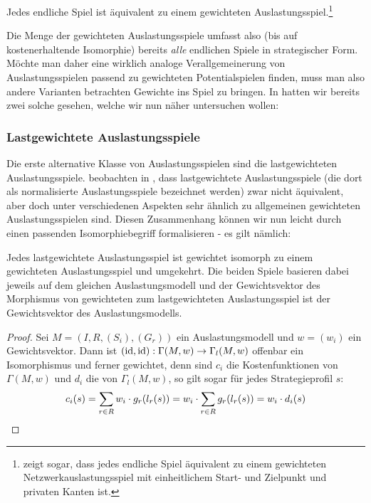 \begin{satz}\label{satz:JedesSpielGewAusl}
	Jedes endliche Spiel ist äquivalent zu einem gewichteten Auslastungsspiel.\footnote{\citeauthor{ReprOfFiniteGamesAsNCG} zeigt sogar, dass jedes endliche Spiel äquivalent zu einem gewichteten Netzwerkauslastungsspiel mit einheitlichem Start- und Zielpunkt und privaten Kanten ist.}
\end{satz}

Die Menge der gewichteten Auslastungsspiele umfasst also (bis auf kostenerhaltende Isomorphie) bereits \emph{alle} endlichen Spiele in strategischer Form. Möchte man daher eine wirklich analoge Verallgemeinerung von Auslastungsspielen passend zu gewichteten Potentialspielen finden, muss man also andere Varianten betrachten Gewichte ins Spiel zu bringen. In  hatten wir bereits zwei solche gesehen, welche wir nun näher untersuchen wollen:

\subsubsection{Lastgewichtete Auslastungsspiele}

Die erste alternative Klasse von Auslastungsspielen sind die lastgewichteten Auslastungsspiele. \citeauthor{CharExGewPotinWCG} beobachten in \cite{CharExGewPotinWCG}, dass lastgewichtete Auslastungsspiele (die dort als normalisierte Auslastungsspiele bezeichnet werden) zwar nicht äquivalent, aber doch unter verschiedenen Aspekten sehr ähnlich zu allgemeinen gewichteten Auslastungsspielen sind. Diesen Zusammenhang können wir nun leicht durch einen passenden Isomorphiebegriff formalisieren - es gilt nämlich:

\begin{lemma}\label{lemma:lastgewAuslIsomGewAusl}
	Jedes lastgewichtete Auslastungsspiel ist gewichtet isomorph zu einem gewichteten Auslastungsspiel und umgekehrt. Die beiden Spiele basieren dabei jeweils auf dem gleichen Auslastungsmodell und der Gewichtsvektor des Morphismus von gewichteten zum lastgewichteten Auslastungsspiel ist der Gewichtsvektor des Auslastungsmodells.
\end{lemma}

\begin{proof}
	Sei $M = (I, R, (S_i), (G_r))$ ein Auslastungsmodell und $w = (w_i)$ ein Gewichtsvektor. Dann ist $(\mathrm{id}, \mathrm{id}): \Gamma(M, w) \to \Gamma_l(M,w)$ offenbar ein Isomorphismus und ferner gewichtet, denn sind $c_i$ die Kostenfunktionen von $\Gamma(M, w)$ und $d_i$ die von $\Gamma_l(M,w)$, so gilt sogar für jedes Strategieprofil $s$:
		\[c_i(s) = \sum_{r \in R} w_i\cdot g_r(l_r(s)) = w_i \cdot \sum_{r \in R} g_r(l_r(s)) = w_i \cdot d_i(s) \qedhere\]
\end{proof}

